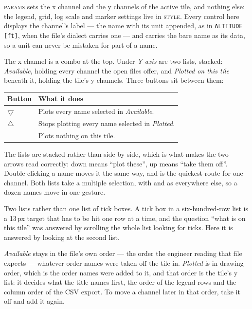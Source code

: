 \documentclass[11pt,a4paper,oneside]{report}
\newcommand{\code}[1]{\texttt{#1}}
\newcommand{\key}[1]{\textsf{\small\fbox{#1}}}
\newcommand{\tab}[1]{\textsc{#1}}
\begin{document}
\tab{params} sets the x channel and the y channels of the active tile, and
nothing else: the legend, grid, log scale and marker settings live in
\tab{style}. Every control here displays the channel's label --- the name with
its unit appended, as in \code{ALTITUDE [ft]}, when the file's dialect carries
one --- and carries the bare name as its data, so a unit can never be mistaken
for part of a name.

The x channel is a combo at the top. Under \emph{Y axis} are two lists,
stacked: \emph{Available}, holding every channel the open files offer, and
\emph{Plotted on this tile} beneath it, holding the tile's y channels. Three
buttons sit between them:

\begin{center}
\small
\begin{tabular}{@{}p{}p{}@{}}
\toprule
\textbf{Button} & \textbf{What it does} \\
\midrule
$\bigtriangledown$ & Plots every name selected in \emph{Available}. \\
$\bigtriangleup$ & Stops plotting every name selected in \emph{Plotted}. \\
\code{\texttimes} & Plots nothing on this tile. \\
\bottomrule
\end{tabular}
\end{center}

The lists are stacked rather than side by side, which is what makes the two
arrows read correctly: down means ``plot these'', up means ``take them off''.
Double-clicking a name moves it the same way, and is the quickest route for
one channel. Both lists take a multiple selection, with \key{Ctrl} and
\key{Shift} as everywhere else, so a dozen names move in one gesture.

Two lists rather than one list of tick boxes. A tick box in a six-hundred-row
list is a 13\,px target that has to be hit one row at a time, and the question
``what is on this tile'' was answered by scrolling the whole list looking for
ticks. Here it is answered by looking at the second list.

\emph{Available} stays in the file's own order --- the order the engineer
reading that file expects --- whatever order names were taken off the tile in.
\emph{Plotted} is in drawing order, which is the order names were added to it,
and that order is the tile's y list: it decides what the title names first, the
order of the legend rows and the column order of the CSV export. To move a
channel later in that order, take it off and add it again.
\end{document}
